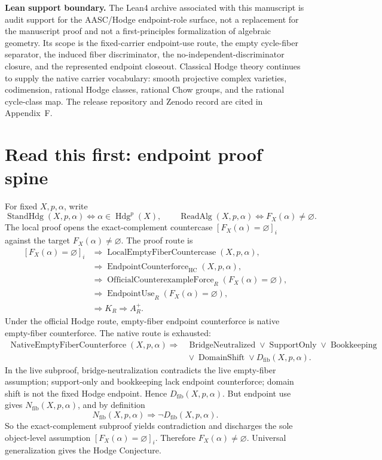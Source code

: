 \documentclass[11pt]{article}
\newcommand{\Hdg}{\operatorname{Hdg}}
\newcommand{\HC}{\operatorname{HC}}
\newcommand{\EndpointUse}{\operatorname{EndpointUse}}
\newcommand{\OfficialCounterexampleForce}{\operatorname{OfficialCounterexampleForce}}
\newcommand{\ReadAlg}{\operatorname{ReadAlg}}
\newcommand{\StandHdg}{\operatorname{StandHdg}}
\begin{document}
\par\noindent\textbf{Lean support boundary.} The Lean4 archive associated with this manuscript is audit support for the AASC/Hodge endpoint-role surface, not a replacement for the manuscript proof and not a first-principles formalization of algebraic geometry. Its scope is the fixed-carrier endpoint-use route, the empty cycle-fiber separator, the induced fiber discriminator, the no-independent-discriminator closure, and the represented endpoint closeout. Classical Hodge theory continues to supply the native carrier vocabulary: smooth projective complex varieties, codimension, rational Hodge classes, rational Chow groups, and the rational cycle-class map. The release repository and Zenodo record are cited in Appendix~F.

\section{Read this first: endpoint proof spine}


For fixed $X,p,\alpha$, write
\[
\StandHdg(X,p,\alpha)\Longleftrightarrow \alpha\in\Hdg^p(X),\qquad
\ReadAlg(X,p,\alpha)\Longleftrightarrow F_X(\alpha)\neq\varnothing.
\]
The local proof opens the exact-complement countercase $[F_X(\alpha)=\varnothing]_i$ against the target $F_X(\alpha)\neq\varnothing$. The proof route is
\[
\begin{aligned}
[F_X(\alpha)=\varnothing]_i&\Rightarrow \operatorname{LocalEmptyFiberCountercase}(X,p,\alpha),\\
&\Rightarrow \operatorname{EndpointCounterforce}_{\HC}(X,p,\alpha),\\
&\Rightarrow \OfficialCounterexampleForce_R(F_X(\alpha)=\varnothing),\\
&\Rightarrow \EndpointUse_R(F_X(\alpha)=\varnothing),\\
&\Rightarrow K_R\Rightarrow A^+_R.
\end{aligned}
\]
Under the official Hodge route, empty-fiber endpoint counterforce is native empty-fiber counterforce. The native route is exhausted:
\[
\begin{aligned}
\operatorname{NativeEmptyFiberCounterforce}(X,p,\alpha)\Rightarrow{}&
\operatorname{BridgeNeutralized}
\vee \operatorname{SupportOnly}\vee \operatorname{Bookkeeping}\\
&{}\vee \operatorname{DomainShift}\vee D_{\mathrm{fib}}(X,p,\alpha).
\end{aligned}
\]
In the live subproof, bridge-neutralization contradicts the live empty-fiber assumption; support-only and bookkeeping lack endpoint counterforce; domain shift is not the fixed Hodge endpoint. Hence $D_{\mathrm{fib}}(X,p,\alpha)$. But endpoint use gives $N_{\mathrm{fib}}(X,p,\alpha)$, and by definition
\[
N_{\mathrm{fib}}(X,p,\alpha)\Rightarrow \neg D_{\mathrm{fib}}(X,p,\alpha).
\]
So the exact-complement subproof yields contradiction and discharges the sole object-level assumption $[F_X(\alpha)=\varnothing]_i$. Therefore $F_X(\alpha)\neq\varnothing$. Universal generalization gives the Hodge Conjecture.
\end{document}
